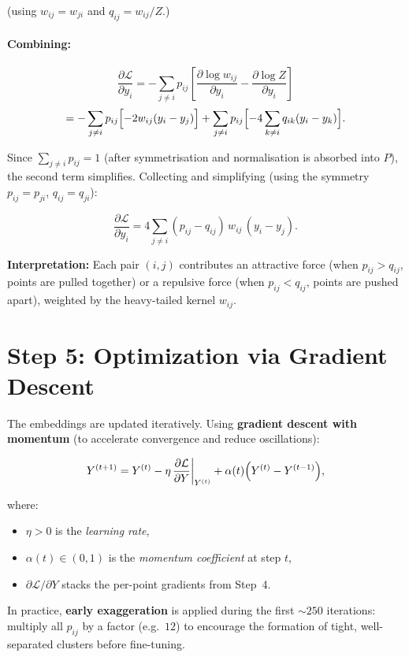 \documentclass[11pt]{article}
\begin{document}
(using $w_{ij}=w_{ji}$ and $q_{ij}=w_{ij}/Z$.)

\paragraph{Combining:}

\[
  \frac{\partial\mathcal{L}}{\partial y_i}
  = -\sum_{j\neq i}p_{ij}\left[\frac{\partial \log w_{ij}}{\partial y_i}
    - \frac{\partial \log Z}{\partial y_i}\right]
\]
\[
  = -\sum_{j\neq i}p_{ij}\Bigl[-2w_{ij}(y_i-y_j)\Bigr]
    + \sum_{j\neq i}p_{ij}\Bigl[-4\sum_{k\neq i}q_{ik}(y_i-y_k)\Bigr].
\]

Since $\sum_{j\neq i}p_{ij}=1$ (after symmetrisation and normalisation is
absorbed into $P$), the second term simplifies. Collecting and simplifying
(using the symmetry $p_{ij}=p_{ji}$, $q_{ij}=q_{ji}$):

\[
  \boxed{
  \frac{\partial \mathcal{L}}{\partial y_i}
  = 4\sum_{j\neq i}(p_{ij} - q_{ij})\,w_{ij}\,(y_i - y_j)
  }.
\]

\textbf{Interpretation:} Each pair $(i,j)$ contributes an attractive force
(when $p_{ij} > q_{ij}$, points are pulled together) or a repulsive force
(when $p_{ij} < q_{ij}$, points are pushed apart), weighted by the
heavy-tailed kernel $w_{ij}$.

\section*{Step 5: Optimization via Gradient Descent}

The embeddings are updated iteratively. Using \textbf{gradient descent with
momentum} (to accelerate convergence and reduce oscillations):

\[
  Y^{(t+1)}
  = Y^{(t)}
  - \eta\,\frac{\partial \mathcal{L}}{\partial Y}\bigg|_{Y^{(t)}}
  + \alpha(t)\Bigl(Y^{(t)} - Y^{(t-1)}\Bigr),
\]

where:
\begin{itemize}
  \item $\eta > 0$ is the \emph{learning rate},
  \item $\alpha(t) \in (0,1)$ is the \emph{momentum coefficient} at step $t$,
  \item $\partial\mathcal{L}/\partial Y$ stacks the per-point gradients from Step~4.
\end{itemize}

In practice, \textbf{early exaggeration} is applied during the first
$\sim\!250$ iterations: multiply all $p_{ij}$ by a factor (e.g.\ $12$) to
encourage the formation of tight, well-separated clusters before fine-tuning.
\end{document}
